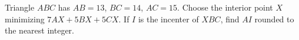 Triangle $ABC$ has $AB=13$, $BC=14$, $AC=15$. Choose the interior point $X$ minimizing $7AX+5BX+5CX$. If $I$ is the incenter of $XBC$, find $AI$ rounded to the nearest integer.
